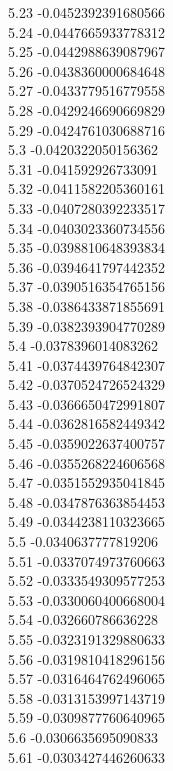 {5.23	-0.0452392391680566\\
5.24	-0.0447665933778312\\
5.25	-0.0442988639087967\\
5.26	-0.0438360000684648\\
5.27	-0.0433779516779558\\
5.28	-0.0429246690669829\\
5.29	-0.0424761030688716\\
5.3	-0.0420322050156362\\
5.31	-0.041592926733091\\
5.32	-0.0411582205360161\\
5.33	-0.0407280392233517\\
5.34	-0.0403023360734556\\
5.35	-0.0398810648393834\\
5.36	-0.0394641797442352\\
5.37	-0.0390516354765156\\
5.38	-0.0386433871855691\\
5.39	-0.0382393904770289\\
5.4	-0.0378396014083262\\
5.41	-0.0374439764842307\\
5.42	-0.0370524726524329\\
5.43	-0.0366650472991807\\
5.44	-0.0362816582449342\\
5.45	-0.0359022637400757\\
5.46	-0.0355268224606568\\
5.47	-0.0351552935041845\\
5.48	-0.0347876363854453\\
5.49	-0.0344238110323665\\
5.5	-0.0340637777819206\\
5.51	-0.0337074973760663\\
5.52	-0.0333549309577253\\
5.53	-0.0330060400668004\\
5.54	-0.032660786636228\\
5.55	-0.0323191329880633\\
5.56	-0.0319810418296156\\
5.57	-0.0316464762496065\\
5.58	-0.0313153997143719\\
5.59	-0.0309877760640965\\
5.6	-0.0306635695090833\\
5.61	-0.0303427446260633\\
}
